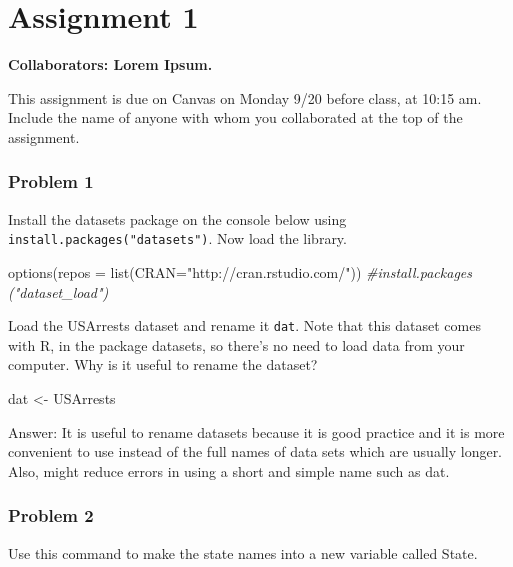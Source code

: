 \documentclass[
]{article}
\newenvironment{Shaded}{\begin{snugshade}}{\end{snugshade}}
\newcommand{\AttributeTok}[1]{\textcolor[rgb]{0.77,0.63,0.00}{#1}}
\newcommand{\CommentTok}[1]{\textcolor[rgb]{0.56,0.35,0.01}{\textit{#1}}}
\newcommand{\FunctionTok}[1]{\textcolor[rgb]{0.00,0.00,0.00}{#1}}
\newcommand{\NormalTok}[1]{#1}
\newcommand{\OtherTok}[1]{\textcolor[rgb]{0.56,0.35,0.01}{#1}}
\newcommand{\StringTok}[1]{\textcolor[rgb]{0.31,0.60,0.02}{#1}}
\begin{document}
\hypertarget{assignment-1}{%
\section{Assignment 1}\label{assignment-1}}

\textbf{Collaborators: Lorem Ipsum. }

This assignment is due on Canvas on Monday 9/20 before class, at 10:15
am. Include the name of anyone with whom you collaborated at the top of
the assignment.

\hypertarget{problem-1}{%
\subsubsection{Problem 1}\label{problem-1}}

Install the datasets package on the console below using
\texttt{install.packages("datasets")}. Now load the library.

\begin{Shaded}
\begin{Highlighting}[]
\FunctionTok{options}\NormalTok{(}\AttributeTok{repos =} \FunctionTok{list}\NormalTok{(}\AttributeTok{CRAN=}\StringTok{"http://cran.rstudio.com/"}\NormalTok{))}
\CommentTok{\#install.packages ("dataset\_load")}
\end{Highlighting}
\end{Shaded}

Load the USArrests dataset and rename it \texttt{dat}. Note that this
dataset comes with R, in the package datasets, so there's no need to
load data from your computer. Why is it useful to rename the dataset?

\begin{Shaded}
\begin{Highlighting}[]
\NormalTok{dat }\OtherTok{\textless{}{-}}\NormalTok{ USArrests}
\end{Highlighting}
\end{Shaded}

Answer: It is useful to rename datasets because it is good practice and
it is more convenient to use instead of the full names of data sets
which are usually longer. Also, might reduce errors in using a short and
simple name such as dat.

\hypertarget{problem-2}{%
\subsubsection{Problem 2}\label{problem-2}}

Use this command to make the state names into a new variable called
State.
\end{document}
